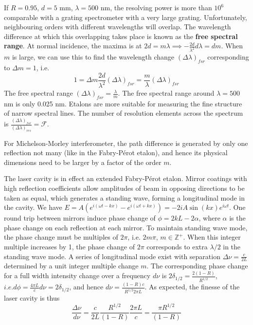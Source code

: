 \documentclass[a4paper]{article}
\begin{document}
\begin{Note}
If $R=0.95$, $d=5$ mm, $\lambda=500$ nm, the resolving power is more than $10^6$ comparable with a grating spectrometer with a very large grating. Unfortunately, neighbouring orders with different wavelengths will overlap. The wavelength difference at which this  overlapping takes place is known as the \textbf{free spectral range}. At normal incidence, the maxima is at $2d=m\lambda\implies-\frac{2d}{\lambda^2}d\lambda=dm$. When $m$ is large, we can use this to find the wavelength change $(\Delta\lambda)_{fsr}$ corresponding to $\Delta m=1$, i.e.
$$1=\Delta m\frac{2d}{\lambda^2}(\Delta\lambda)_{fsr}=\frac{m}{\lambda}(\Delta\lambda)_{fsr}$$
The free spectral range $(\Delta\lambda)_{fsr}=\frac{\lambda}{m}$. The free spectral range around $\lambda=500$ nm is only 0.025 nm. Etalons are more suitable for measuring the fine structure of narrow spectral lines. The number of resolution elements across the spectrum is $\frac{(\Delta\lambda)_{fsr}}{(\Delta\lambda)_{res}}=\mathcal{F}$.
\end{Note}
\begin{Note}
For Michelson-Morley interferometer, the path difference is generated by only one reflection not many (like in the Fabry-Pérot etalon), and hence its physical dimensions need to be larger by a factor of the order $m$.
\end{Note}
\begin{eg}
The laser cavity is in effect an extended Fabry-Pérot etalon. Mirror coatings with high reflection coefficients allow amplitudes of beam in opposing directions to be taken as equal, which generates a standing wave, forming a longitudinal mode in the cavity. We have $E=A(e^{i(\omega t-kx)}-e^{i(\omega t+kx)})=-2iA\sin(kx)e^{i\omega t}$. One round trip between mirrors induce phase change of $\phi=2kL-2\alpha$, where $\alpha$ is the phase change on each reflection at each mirror. To maintain standing wave mode, the phase change must be multiples of $2\pi$, i.e. $2m\pi$, $m\in\mathbb{Z}^+$. When this integer multiple increases by 1, the phase change of $2\pi$ corresponds to extra $\lambda/2$ in the standing wave mode. A series of longitudinal mode exist with separation $\Delta\nu=\frac{c}{2L}$ determined by a unit integer multiple change $m$. The corresponding phase change for a full width intensity change over a frequency $d\nu$ is $2\delta_{1/2}=\frac{2(1-R)}{R^{1/2}}$, $i.e. d\phi=\frac{4\pi L}{c}d\nu=2\delta_{1/2}$, and hence $d\nu=\frac{(1-R)c}{R^{1/2}2\pi L}$. As expected, the finesse of the laser cavity is thus $$\frac{\Delta \nu}{d\nu}=\frac{c}{2L}\frac{R^{1/2}}{(1-R)}\frac{2\pi L}{c}=\frac{\pi R^{1/2}}{(1-R)}$$
\end{eg}
\newpage
\end{document}
